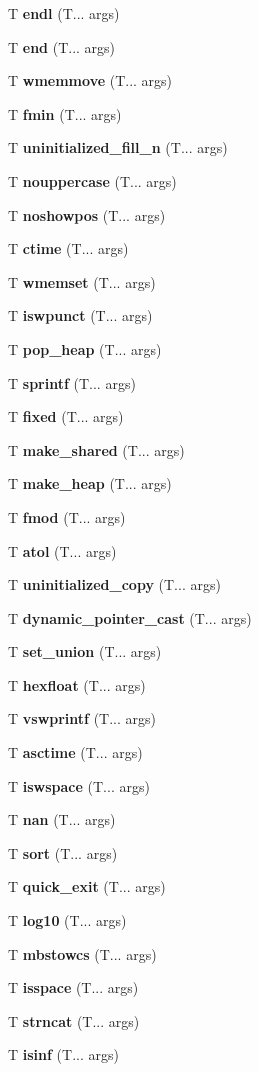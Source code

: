 \begin{DoxyCompactItemize}
T \textbf{ endl} (T... args)
\item 
T \textbf{ end} (T... args)
\item 
T \textbf{ wmemmove} (T... args)
\item 
T \textbf{ fmin} (T... args)
\item 
T \textbf{ uninitialized\+\_\+fill\+\_\+n} (T... args)
\item 
T \textbf{ nouppercase} (T... args)
\item 
T \textbf{ noshowpos} (T... args)
\item 
T \textbf{ ctime} (T... args)
\item 
T \textbf{ wmemset} (T... args)
\item 
T \textbf{ iswpunct} (T... args)
\item 
T \textbf{ pop\+\_\+heap} (T... args)
\item 
T \textbf{ sprintf} (T... args)
\item 
T \textbf{ fixed} (T... args)
\item 
T \textbf{ make\+\_\+shared} (T... args)
\item 
T \textbf{ make\+\_\+heap} (T... args)
\item 
T \textbf{ fmod} (T... args)
\item 
T \textbf{ atol} (T... args)
\item 
T \textbf{ uninitialized\+\_\+copy} (T... args)
\item 
T \textbf{ dynamic\+\_\+pointer\+\_\+cast} (T... args)
\item 
T \textbf{ set\+\_\+union} (T... args)
\item 
T \textbf{ hexfloat} (T... args)
\item 
T \textbf{ vswprintf} (T... args)
\item 
T \textbf{ asctime} (T... args)
\item 
T \textbf{ iswspace} (T... args)
\item 
T \textbf{ nan} (T... args)
\item 
T \textbf{ sort} (T... args)
\item 
T \textbf{ quick\+\_\+exit} (T... args)
\item 
T \textbf{ log10} (T... args)
\item 
T \textbf{ mbstowcs} (T... args)
\item 
T \textbf{ isspace} (T... args)
\item 
T \textbf{ strncat} (T... args)
\item 
T \textbf{ isinf} (T... args)
\item 

\end{DoxyCompactItemize}
